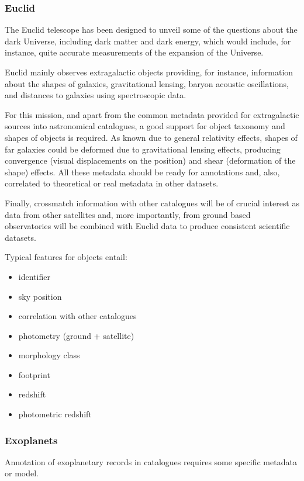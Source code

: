 \subsubsection{Euclid}
The Euclid telescope has been designed to unveil some of the questions about the
dark Universe, including dark matter and dark energy, which would include, for instance,
quite accurate measurements of the expansion of the Universe.

Euclid mainly observes extragalactic objects providing, for instance, information
about the shapes of galaxies, gravitational lensing, baryon acoustic oscillations,
and distances to galaxies using spectroscopic data.

For this mission, and apart from the common metadata provided for extragalactic
sources into astronomical catalogues, a good support for object taxonomy and
shapes of objects is required. As known due to general relativity effects,
shapes of far galaxies could be deformed due to gravitational lensing effects,
producing convergence (visual displacements on the position) and shear (deformation
of the shape) effects. All these metadata should be ready for annotations and,
also, correlated to theoretical or real metadata in other datasets.

Finally, crossmatch information with other catalogues will be of crucial interest
as data from other satellites and, more importantly, from ground based
observatories will be combined with Euclid data to produce consistent scientific
datasets.

Typical features for objects entail: 

\begin{itemize}[noitemsep,topsep=0pt,parsep=0pt,partopsep=0pt]
    \item identifier
    \item sky position
    \item correlation with other catalogues
    \item photometry (ground + satellite)
    \item morphology class
    \item footprint
    \item redshift
    \item photometric redshift
\end{itemize}

\subsubsection{Exoplanets}
Annotation of exoplanetary records in catalogues requires some
specific metadata or model.

